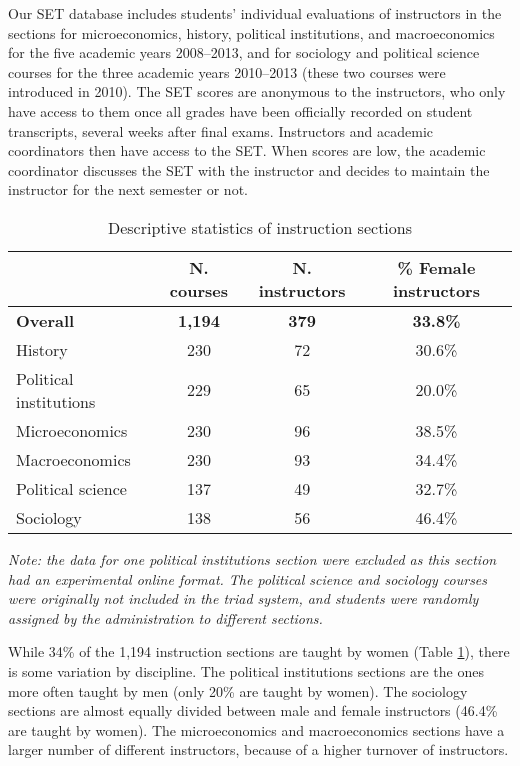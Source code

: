 \documentclass[12pt]{article}
\begin{document}
Our SET database includes students' individual evaluations of instructors in the sections for microeconomics, history, political institutions, and macroeconomics for the five academic years 2008--2013, and for sociology and political science courses for the three academic years 2010--2013 
(these two courses were introduced in 2010). The SET scores are anonymous to the instructors, who only have access to them once all grades have been officially recorded on student transcripts, several weeks after final exams. Instructors and academic coordinators then have access to the SET. When scores are low, the academic coordinator discusses the SET with the instructor and decides to maintain the instructor for the next semester or not.   
 


\begin{table}[htbp]
  \centering
  \footnotesize 
  \caption{Descriptive statistics of instruction sections}
    \begin{tabular}{lccc}
    \toprule 
                        & N. courses & N. instructors  & \% Female instructors  \\
   \midrule
  \textbf{Overall} &  \textbf{1,194} & \textbf{379}  &\textbf{33.8\%} \\
    History    &               230 &      72          &   30.6\% \\
    Political institutions  &  229 &      65          &   20.0\% \\    
    Microeconomics   &         230 &      96          &   38.5\% \\
    Macroeconomics   &         230 &      93          &   34.4\% \\
    Political science &       137 &      49          &   32.7\% \\
    Sociology   &              138 &      56          &   46.4\%    \\
    \bottomrule
    \end{tabular}%
 \label{tab:description}%
 
\textit{Note: the data for one political institutions section were excluded as this section had an experimental online format. The political science and sociology courses were originally not included in the triad system, and students were randomly assigned by the administration to different sections.} 

\end{table}%
\normalsize

While 34\% of the 1,194 instruction sections are taught by women (Table \ref{tab:description}), there is some variation by discipline. The political institutions sections are the ones more often taught by men (only 20\% are taught by women). The sociology sections are almost equally divided between male and female instructors (46.4\% are taught by women). The microeconomics and macroeconomics sections have a larger number of different instructors, because of a higher turnover of instructors.   
\end{document}
